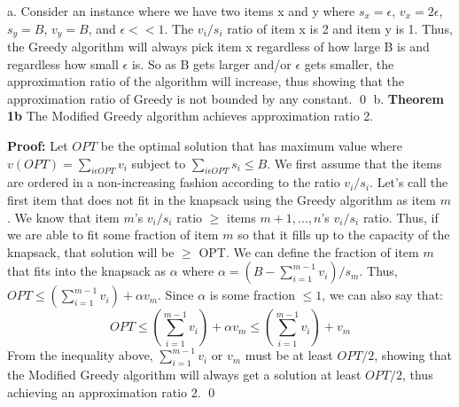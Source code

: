 \documentclass[oneside]{homework} %
\begin{document}
\maketitle
\skipevenpage

{\large a.} Consider an instance where we have two items x and y where $s_x = \epsilon$, $v_x = 2\epsilon$, $s_y = B$, $v_y =B$, and $\epsilon << 1$. The $v_i/s_i$ ratio of item x is 2 and item y is 1. Thus, the Greedy algorithm will always pick item x regardless of how large B is and regardless how small $\epsilon$ is. So as B gets larger and/or $\epsilon$ gets smaller, the approximation ratio of the algorithm will increase, thus showing that the approximation ratio of Greedy is not bounded by any constant. \hfill\qed
\newline
\newline
{\large b.} \textbf{Theorem 1b} The Modified Greedy algorithm achieves approximation ratio 2.
\newline

\textbf{Proof:} Let $OPT$ be the optimal solution that has maximum value where $v(OPT) = \sum\limits_{i\epsilon OPT}v_i$ subject to $\sum\limits_{i\epsilon OPT}s_i \leq B$. We first assume that the items are ordered in a non-increasing fashion according to the ratio $v_i/s_i$. Let's call the first item that does not fit in the knapsack using the Greedy algorithm as item $m$. We know that item $m$'s $v_i/s_i$ ratio $\geq$ items $m+1,...,n$'s $v_i/s_i$ ratio. Thus, if we are able to fit some fraction of item $m$ so that it fills up to the capacity of the knapsack, that solution will be $\geq$ OPT. We can define the fraction of item $m$ that fits into the knapsack as $\alpha$ where $\alpha = (B - \sum\limits_{i=1}^{m-1} v_i) / s_m$. Thus, $OPT \leq (\sum\limits_{i=1}^{m-1} v_i) + \alpha v_m$. Since $\alpha$ is some fraction $\leq 1$, we can also say that: $$OPT \leq (\sum\limits_{i=1}^{m-1} v_i) + \alpha v_m \leq (\sum\limits_{i=1}^{m-1} v_i) + v_m$$ From the inequality above, $\sum\limits_{i=1}^{m-1} v_i$ or $v_m$ must be at least $OPT/2$, showing that the Modified Greedy algorithm will always get a solution at least $OPT/2$, thus achieving an approximation ratio 2. \hfill\qed
\end{document}

